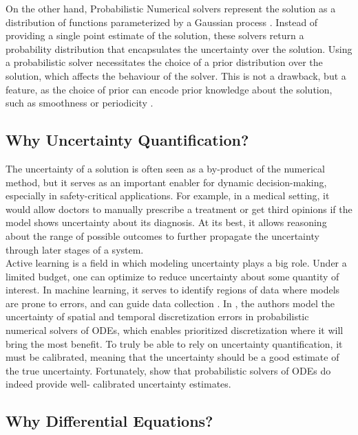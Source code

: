 On the other hand, Probabilistic Numerical solvers represent the solution as a distribution of functions \cite{nicoThesis} parameterized by a Gaussian process \cite{gp_Rasmussen}. Instead of providing a single point estimate of the solution, these solvers return a probability distribution that encapsulates the uncertainty over the solution. Using a probabilistic solver necessitates the choice of a prior distribution over the solution, which affects the behaviour of the solver. This is not a drawback, but a feature, as the choice of prior can encode prior knowledge about the solution, such as smoothness or periodicity \cite{gp_Rasmussen}. 

\subsection*{Why Uncertainty Quantification?}

The uncertainty of a solution is often seen as a by-product of the numerical method, but it serves as an important enabler for dynamic decision-making, especially in safety-critical applications. For example, in a medical setting, it would allow doctors to manually prescribe a treatment or get third opinions if the model shows uncertainty about its diagnosis. 
At its best, it allows reasoning about the range of possible outcomes to further propagate the uncertainty through later stages of a system.
\\
Active learning \cite{active_learning} is a field in which modeling uncertainty plays a big role. Under a limited budget, one can optimize to reduce uncertainty about some quantity of interest. In machine learning, it serves to identify regions of data where models are prone to errors, and can guide data collection \cite{safeopt}. In \cite{pnmol}, the authors model the uncertainty of spatial and temporal discretization errors in probabilistic numerical solvers of ODEs, which enables prioritized discretization where it will bring the most benefit. 
To truly be able to rely on uncertainty quantification, it must be calibrated, meaning that the uncertainty should be a good estimate of the true uncertainty. Fortunately, \cite{calibrated_probabilistic} show that probabilistic solvers of ODEs do indeed provide well- calibrated uncertainty estimates.

\subsection*{Why Differential Equations?}

